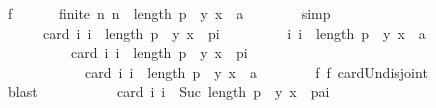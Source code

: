 \begin{isabellebody}
\ f{}{\isacharcolon}{\kern0pt}\isanewline
\ \ \ \ \ \ {\isachardoublequoteopen}finite\ {\isacharbraceleft}{\kern0pt}n{\isachardot}{\kern0pt}\ n\ {\isacharequal}{\kern0pt}\ length\ p\ {\isasymand}\ {\isacharparenleft}{\kern0pt}y{\isacharcomma}{\kern0pt}\ x{\isacharparenright}{\kern0pt}\ {\isasymin}\ {\isacharbrackleft}{\kern0pt}a{\isacharbrackright}{\kern0pt}{\isacharbang}{\kern0pt}{}{\isacharbraceright}{\kern0pt}{\isachardoublequoteclose}\isanewline
\ \ \ \ \ \ \isamarkupfalse%
\ simp\isanewline
\ \ \ \ \isamarkupfalse%
\isanewline
\ \ \ \ \ \ {\isachardoublequoteopen}card\ {\isacharparenleft}{\kern0pt}{\isacharbraceleft}{\kern0pt}i{\isachardot}{\kern0pt}\ i\ {\isacharless}{\kern0pt}\ length\ p\ {\isasymand}\ {\isacharparenleft}{\kern0pt}y{\isacharcomma}{\kern0pt}\ x{\isacharparenright}{\kern0pt}\ {\isasymin}\ p{\isacharbang}{\kern0pt}i{\isacharbraceright}{\kern0pt}\ {\isasymunion}\isanewline
\ \ \ \ \ \ \ \ {\isacharbraceleft}{\kern0pt}i{\isachardot}{\kern0pt}\ i\ {\isacharequal}{\kern0pt}\ length\ p\ {\isasymand}\ {\isacharparenleft}{\kern0pt}y{\isacharcomma}{\kern0pt}\ x{\isacharparenright}{\kern0pt}\ {\isasymin}\ {\isacharbrackleft}{\kern0pt}a{\isacharbrackright}{\kern0pt}{\isacharbang}{\kern0pt}{}{\isacharbraceright}{\kern0pt}{\isacharparenright}{\kern0pt}\ {\isacharequal}{\kern0pt}\isanewline
\ \ \ \ \ \ \ \ \ \ card\ {\isacharbraceleft}{\kern0pt}i{\isachardot}{\kern0pt}\ i\ {\isacharless}{\kern0pt}\ length\ p\ {\isasymand}\ {\isacharparenleft}{\kern0pt}y{\isacharcomma}{\kern0pt}\ x{\isacharparenright}{\kern0pt}\ {\isasymin}\ p{\isacharbang}{\kern0pt}i{\isacharbraceright}{\kern0pt}\ {\isacharplus}{\kern0pt}\isanewline
\ \ \ \ \ \ \ \ \ \ \ \ card\ {\isacharbraceleft}{\kern0pt}i{\isachardot}{\kern0pt}\ i\ {\isacharequal}{\kern0pt}\ length\ p\ {\isasymand}\ {\isacharparenleft}{\kern0pt}y{\isacharcomma}{\kern0pt}\ x{\isacharparenright}{\kern0pt}\ {\isasymin}\ {\isacharbrackleft}{\kern0pt}a{\isacharbrackright}{\kern0pt}{\isacharbang}{\kern0pt}{}{\isacharbraceright}{\kern0pt}{\isachardoublequoteclose}\isanewline
\ \ \ \ \ \ \isamarkupfalse%
\ f{}\ f{}\ card{\isacharunderscore}{\kern0pt}Un{\isacharunderscore}{\kern0pt}disjoint\isanewline
\ \ \ \ \ \ \isamarkupfalse%
\ blast\isanewline
\ \ \ \ \isamarkupfalse%
\isanewline
\ \ \ \ \ \ {\isachardoublequoteopen}card\ {\isacharbraceleft}{\kern0pt}i{\isachardot}{\kern0pt}\ i\ {\isacharless}{\kern0pt}\ Suc\ {\isacharparenleft}{\kern0pt}length\ p{\isacharparenright}{\kern0pt}\ {\isasymand}\ {\isacharparenleft}{\kern0pt}y{\isacharcomma}{\kern0pt}\ x{\isacharparenright}{\kern0pt}\ {\isasymin}\ {\isacharparenleft}{\kern0pt}p{\isacharat}{\kern0pt}{\isacharbrackleft}{\kern0pt}a{\isacharbrackright}{\kern0pt}{\isacharparenright}{\kern0pt}{\isacharbang}{\kern0pt}i{\isacharbraceright}{\kern0pt}\ {\isacharequal}{\kern0pt}\isanewline

\end{isabellebody}

